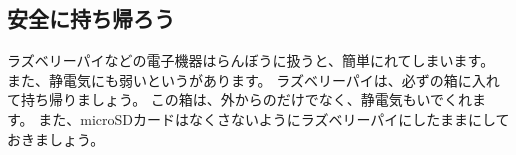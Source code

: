 %
%
\subsection{安全に持ち帰ろう}

ラズベリーパイなどの電子機器はらんぼうに扱うと、簡単にれてしまいます。
また、静電気にも弱いというがあります。
ラズベリーパイは、必ずの箱に入れて持ち帰りましょう。
この箱は、外からのだけでなく、静電気もいでくれます。
また、microSDカードはなくさないようにラズベリーパイにしたままにしておきましょう。


\clearpage

